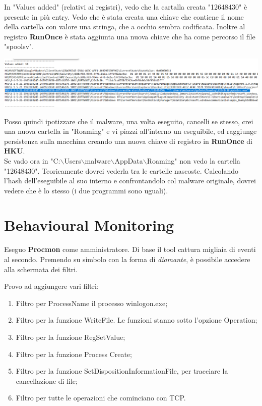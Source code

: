 \documentclass[a4paper]{book}
\begin{document}
In "Values added" (relativi ai registri), vedo che la cartalla creata "12648430" è presente in più entry. 
Vedo che è stata creata una chiave che contiene il nome della cartella con valore una stringa, che a occhio sembra codificata. Inoltre al registro \textbf{RunOnce} è stata aggiunta una nuova chiave che ha come percorso il file "spoolsv".

\begin{center}
    \includegraphics[width=1\textwidth]{images/20-10/5.png}
\end{center}
Posso quindi ipotizzare che il malware, una volta eseguito, cancelli se stesso, crei una nuova cartella in "Roaming" e vi piazzi all'interno un eseguibile, ed raggiunge persistenza sulla macchina creando una nuova chiave di registro in \textbf{RunOnce} di \textbf{HKU}.
\\

Se vado ora in "C:$\backslash$Users$\backslash$malware$\backslash$AppData$\backslash$Roaming" non vedo la cartella "12648430". Teoricamente dovrei vederla tra le cartelle nascoste. Calcolando l'hash dell'eseguibile al suo interno e confrontandolo col malware originale, dovrei vedere che è lo stesso (i due programmi sono uguali).

\section{Behavioural Monitoring}

Eseguo \textbf{Procmon} come amministratore. Di base il tool cattura migliaia di eventi al secondo. Premendo su simbolo con la forma di \textit{diamante}, è possibile accedere alla schermata dei filtri. 

Provo ad aggiungere vari filtri:
\begin{enumerate}
    \item Filtro per ProcessName il processo winlogon.exe;
    \item Filtro per la funzione WriteFile. Le funzioni stanno sotto l'opzione Operation;
    \item Filtro per la funzione RegSetValue;
    \item Filtro per la funzione Process Create;
    \item Filtro per la funzione SetDispositionInformationFile, per tracciare la cancellazione di file;
    \item Filtro per tutte le operazioni che cominciano con TCP.
\end{enumerate}
\\
\end{document}
